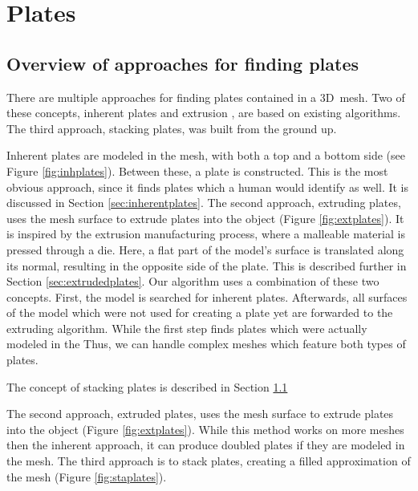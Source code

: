\documentclass[../ClassicThesis.tex]{subfiles}
\begin{document}
\chapter{Plates}\label{ch:plates}

\section{Overview of approaches for finding plates}

There are multiple approaches for finding plates contained in a 3D~mesh. Two of these concepts, inherent plates \cite[p.~32]{master-thesis} and extrusion \cite[p.~28]{master-thesis}, are based on existing algorithms. The third approach, stacking plates, was built from the ground up.

Inherent plates are modeled in the mesh, with both a top and a bottom side (see Figure \ref{fig:inhplates}). Between these, a plate is constructed. This is the most obvious approach, since it finds plates which a human would identify as well. It is discussed in Section \ref{sec:inherentplates}. The second approach, extruding plates, uses the mesh surface to extrude plates into the object (Figure \ref{fig:extplates}). It is inspired by the extrusion manufacturing process, where a malleable material is pressed through a die. Here, a flat part of the model's surface is translated along its normal, resulting in the opposite side of the plate. This is described further in Section \ref{sec:extrudedplates}. Our algorithm uses a combination of these two concepts. First, the model is searched for inherent plates. Afterwards, all surfaces of the model which were not used for creating a plate yet are forwarded to the extruding algorithm. While the first step finds plates which were actually modeled in the  Thus, we can handle complex meshes which feature both types of plates. 

The concept of stacking plates is described in Section \ref{}

The second approach, extruded plates, uses the mesh surface to extrude plates into the object (Figure \ref{fig:extplates}). While this method works on more meshes then the inherent approach, it can produce doubled plates if they are modeled in the mesh. The third approach is to stack plates, creating a filled approximation of the mesh (Figure \ref{fig:staplates}).
\end{document}
